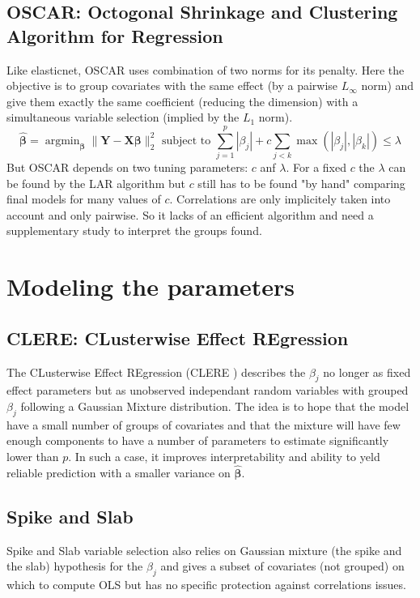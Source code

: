 \documentclass[11pt,a4paper]{report}
\begin{document}
		\subsection{OSCAR: Octogonal Shrinkage and Clustering Algorithm for Regression }
			Like elasticnet, \textsc{OSCAR} \cite{bondell2008simultaneous} uses combination of two norms for its penalty. Here the objective is to group covariates with the same effect (by a pairwise $L_\infty$ norm) and give them exactly the same coefficient (reducing the dimension) with a simultaneous variable selection (implied by the $L_1$ norm).
			\begin{equation}
				\hat{\boldsymbol{\beta}}=\operatorname{argmin}_{\boldsymbol{\beta}} \parallel\boldsymbol{Y}-\boldsymbol{X}\boldsymbol{\beta} \parallel^2_2 \textrm{ subject to } \sum_{j=1}^p|\beta_j|+c\sum_{j<k}\operatorname{max}(|\beta_j|,|\beta_k|) \leq \lambda		
			\end{equation}						
			But \textsc{OSCAR} depends on two tuning parameters: $c$ anf $\lambda$. For a fixed $c$ the $\lambda$ can be found by the \textsc{LAR} algorithm but $c$ still has to be found "by hand" comparing final models for many values of $c$.
			Correlations are only implicitely taken into account and only pairwise. So it lacks of an efficient algorithm and need a supplementary study to interpret the groups found.
	\section{Modeling the parameters}	
		\subsection{CLERE: CLusterwise Effect REgression}
			\cite{yengo2012variable}%
			The CLusterwise Effect REgression (\textsc{CLERE} \cite{yengo2012variable}) describes the $\beta_j$ no longer as fixed effect parameters but as unobserved independant random variables with grouped $\beta_j$ following a Gaussian Mixture distribution. The idea is to hope that the model have a small number of groups of covariates and that the mixture will have few enough components to have a number of parameters to estimate significantly lower than $p$. In such a case, it improves interpretability and ability to yeld reliable prediction with a smaller variance on $\boldsymbol{\hat{\beta}}$. 
	
		\subsection{Spike and Slab}	
			\cite{ishwaran2005spike}%
			Spike and Slab variable selection \cite{ishwaran2005spike} also relies on Gaussian mixture (the spike and the slab) hypothesis for the $\beta_j$ and gives a subset of covariates (not grouped) on which to compute \textsc{OLS} but has no specific protection against correlations issues.
\end{document}

